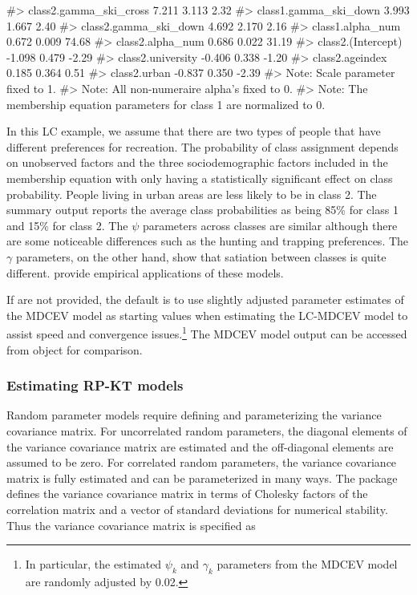 \begin{Schunk}
\begin{Soutput}
#> class2.gamma_ski_cross         7.211   3.113   2.32
#> class1.gamma_ski_down          3.993   1.667   2.40
#> class2.gamma_ski_down          4.692   2.170   2.16
#> class1.alpha_num               0.672   0.009  74.68
#> class2.alpha_num               0.686   0.022  31.19
#> class2.(Intercept)            -1.098   0.479  -2.29
#> class2.university             -0.406   0.338  -1.20
#> class2.ageindex                0.185   0.364   0.51
#> class2.urban                  -0.837   0.350  -2.39
#> Note: Scale parameter fixed to 1. 
#> Note: All non-numeraire alpha's fixed to 0. 
#> Note: The membership equation parameters for class 1 are normalized to 0.
\end{Soutput}
\end{Schunk}

In this LC example, we assume that there are two types of people that
have different preferences for recreation. The probability of class
assignment depends on unobserved factors and the three sociodemographic
factors included in the membership equation with only 
having a statistically significant effect on class probability. People
living in urban areas are less likely to be in class 2. The summary
output reports the average class probabilities as being 85\% for class 1
and 15\% for class 2. The \(\psi\) parameters across classes are similar
although there are some noticeable differences such as the hunting and
trapping preferences. The \(\gamma\) parameters, on the other hand, show
that satiation between classes is quite different.
\citet{sobhanilatent2013, kuriyamalatent2010} provide empirical
applications of these models.

If  are not provided, the default is to use
slightly adjusted parameter estimates of the MDCEV model as starting
values when estimating the LC-MDCEV model to assist speed and
convergence issues.\footnote{In particular, the estimated \(\psi_k\) and
  \(\gamma_k\) parameters from the MDCEV model are randomly adjusted by
  0.02.} The MDCEV model output can be accessed from
 object for comparison.

\hypertarget{estimating-rp-kt-models}{%
\subsubsection{Estimating RP-KT models}\label{estimating-rp-kt-models}}

Random parameter models require defining and parameterizing the variance
covariance matrix. For uncorrelated random parameters, the diagonal
elements of the variance covariance matrix are estimated and the
off-diagonal elements are assumed to be zero. For correlated random
parameters, the variance covariance matrix is fully estimated and can be
parameterized in many ways. The  package defines the
variance covariance matrix in terms of Cholesky factors of the
correlation matrix and a vector of standard deviations for numerical
stability. Thus the variance covariance matrix is specified as

